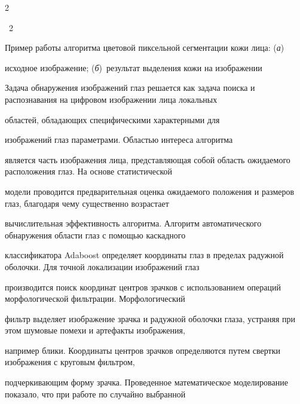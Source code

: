 \begin{multicols}{2}
\vspace*{2pt}


{{\figurename~2}\ \ \small{Пример работы алгоритма цветовой пиксельной сегментации кожи лица: (\textit{а})~


исходное изображение; (\textit{б})~результат выделения кожи на изображении}}












\bigskip


\addtocounter{figure}{1}








Задача обнаружения изображений глаз решается как задача поиска и распознавания на цифро\-вом изображении лица локальных 


областей, об\-ладающих специфическими характерными для\linebreak


 изображений глаз параметрами. Областью интереса алгоритма 


является часть изображения лица, пред\-став\-ля\-ющая собой область ожидаемого расположения глаз. На основе статистической 


модели проводится предварительная оценка ожидаемого положения и размеров глаз, благодаря чему существенно возрастает 


вычислительная эффективность алгоритма. Алгоритм автоматического обнаружения области глаз с помощью каскадного 


классификатора Adaboost определяет координаты глаз в пределах радужной оболочки. Для точной локализации изображений глаз 


производится поиск координат центров зрачков с использованием операций морфологической фильтрации. Морфологический 


фильтр выделяет изображение зрачка и радужной оболочки глаза, устраняя при этом шумовые помехи и артефакты изображения, 


например блики. Координаты центров зрачков определяются путем свертки изображения с круговым фильтром, 


подчеркивающим форму зрачка. Проведенное математическое моделирование показало, что при работе по случайно выбранной 



\end{multicols}
